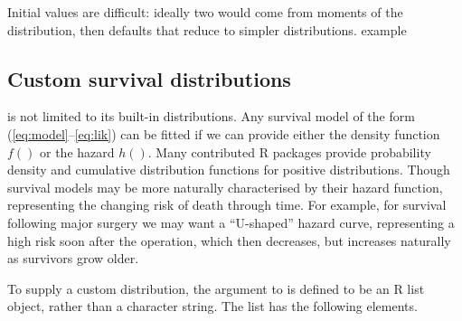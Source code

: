 \documentclass[nojss,nofooter]{jss}
\begin{document}
Initial values are difficult: ideally two would come from moments of
the distribution, then defaults that reduce to simpler distributions.
example

\subsection{Custom survival distributions}
\label{sec:custom}

 is not limited to its built-in distributions.  Any
survival model of the form (\ref{eq:model}--\ref{eq:lik}) can be
fitted if we can provide either the density function $f()$ or the
hazard $h()$.  Many contributed R packages provide probability density
and cumulative distribution functions for positive distributions.  
Though survival models may be more naturally characterised by their
hazard function, representing the changing risk of death through time.
For example, for survival following major surgery we may want a
``U-shaped'' hazard curve, representing a high risk soon after the
operation, which then decreases, but increases naturally as survivors
grow older.

To supply a custom distribution, the  argument to
 is defined to be an R list object, rather than a
character string.  The list has the following elements.
\end{document}
